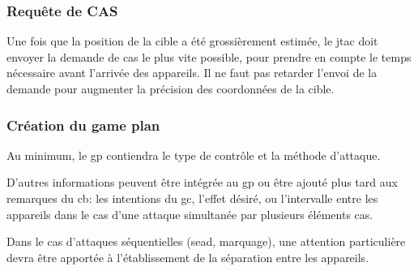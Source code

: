 \begin{e1}
	
	
\end{e1}

\subsubsection{Requête de CAS} %

\begin{e1}
	\item Une fois que la position de la cible a été grossièrement estimée, le \gls{jtac} doit envoyer la demande de \gls{cas} le plus vite possible, pour prendre en compte le temps nécessaire avant l'arrivée des appareils. Il ne faut pas retarder l'envoi de la demande pour augmenter la précision des coordonnées de la cible.
	
\end{e1}

\subsubsection{Création du game plan} %

Au minimum, le \gls{gp} contiendra le type de contrôle et la méthode d'attaque.

D'autres informations peuvent être intégrée au \gls{gp} ou être ajouté plus tard aux remarques du \gls{cb}: les intentions du \gls{gc}, l'effet désiré, ou l'intervalle entre les appareils dans le cas d'une attaque simultanée par plusieurs éléments \gls{cas}.

Dans le cas d'attaques séquentielles (\gls{sead}, marquage), une attention particulière devra être apportée à l'établissement de la séparation entre les appareils.

